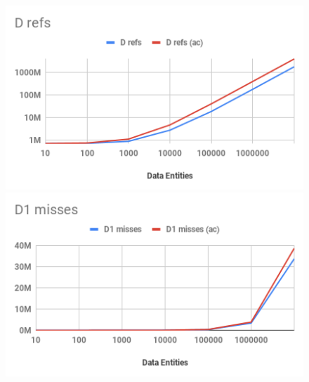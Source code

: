 \begin{figure}[ht]
	\begin{minipage}[b]{0.333\linewidth}
		\centering
		\includegraphics[width=\textwidth,height=\textwidth]{PICs/test_file_d_refs}
	\end{minipage}
\hspace{-0.3cm}
	\begin{minipage}[b]{0.333\linewidth}
		\centering
		\includegraphics[width=\textwidth,height=\textwidth]{PICs/test_file_d1_misses}

\end{minipage}
\end{figure}
